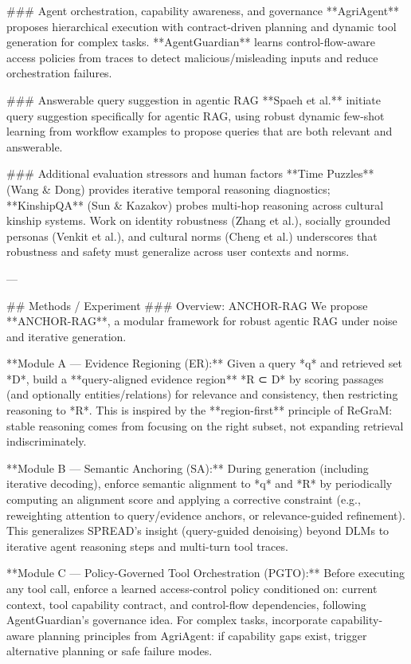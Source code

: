 ### Agent orchestration, capability awareness, and governance  
**AgriAgent** proposes hierarchical execution with contract-driven planning and dynamic tool generation for complex tasks. **AgentGuardian** learns control-flow-aware access policies from traces to detect malicious/misleading inputs and reduce orchestration failures.

### Answerable query suggestion in agentic RAG  
**Spaeh et al.** initiate query suggestion specifically for agentic RAG, using robust dynamic few-shot learning from workflow examples to propose queries that are both relevant and answerable.

### Additional evaluation stressors and human factors  
**Time Puzzles** (Wang & Dong) provides iterative temporal reasoning diagnostics; **KinshipQA** (Sun & Kazakov) probes multi-hop reasoning across cultural kinship systems. Work on identity robustness (Zhang et al.), socially grounded personas (Venkit et al.), and cultural norms (Cheng et al.) underscores that robustness and safety must generalize across user contexts and norms.  

---

## Methods / Experiment  
### Overview: ANCHOR-RAG  
We propose **ANCHOR-RAG**, a modular framework for robust agentic RAG under noise and iterative generation.

**Module A — Evidence Regioning (ER):**  
Given a query *q* and retrieved set *D*, build a **query-aligned evidence region** *R ⊂ D* by scoring passages (and optionally entities/relations) for relevance and consistency, then restricting reasoning to *R*. This is inspired by the **region-first** principle of ReGraM: stable reasoning comes from focusing on the right subset, not expanding retrieval indiscriminately.

**Module B — Semantic Anchoring (SA):**  
During generation (including iterative decoding), enforce semantic alignment to *q* and *R* by periodically computing an alignment score and applying a corrective constraint (e.g., reweighting attention to query/evidence anchors, or relevance-guided refinement). This generalizes SPREAD’s insight (query-guided denoising) beyond DLMs to iterative agent reasoning steps and multi-turn tool traces.

**Module C — Policy-Governed Tool Orchestration (PGTO):**  
Before executing any tool call, enforce a learned access-control policy conditioned on: current context, tool capability contract, and control-flow dependencies, following AgentGuardian’s governance idea. For complex tasks, incorporate capability-aware planning principles from AgriAgent: if capability gaps exist, trigger alternative planning or safe failure modes.

